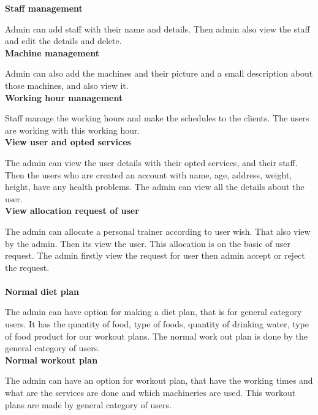 \documentclass[a4paper,12pt,toc=flat]{report}
\begin{document}
{	{\bf \hspace{-20pt} Staff management}
	
	
	Admin can add staff with their name and details. Then admin also view the staff and edit the details and delete.\\
	
	{\bf \hspace{-20pt} Machine management}
	
	
	Admin can also add the machines and their picture and a small description about those machines, and also view it.\\
	
	{\bf \hspace{-20pt} Working hour management}
	
	
	Staff manage the working hours and make the schedules to the clients. The users are working with this working hour.
	\\
	
	{\bf \hspace{-20pt}  View user and opted services}
	
	
	The admin can view the user details with their opted services, and their staff. Then the users who are created an account with name, age, address, weight, height, have any health problems. The admin can view all the details about the user.\\
	
	{\bf \hspace{-20pt}View allocation request of user }
	
	
	The admin can allocate a personal trainer according to user wish. That also view by the admin. Then its view the user. This allocation is on the basic of user request. The  admin firstly view the request for user then admin accept or reject the request.\\
	\pagebreak \\
	
	{\bf \hspace{-20pt} Normal diet plan}
	
	
	The admin can have option for making a diet plan, that is for general category users. It has the quantity of food, type of foods, quantity of drinking water, type of food product for our workout plans. The normal work out plan is done by the general category of users.
	\\
	
	{\bf \hspace{-20pt} Normal workout plan}
	
	
	The admin can have an option for workout plan, that have the working times and what are the services are done and which machineries are used. This workout plans are made by general category of users. \\
	
}
\end{document}
